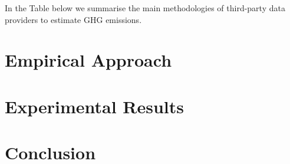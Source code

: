 \documentclass[12pt,twoside]{report}
\begin{document}
In the Table below we summarise the main methodologies of third-party data providers to estimate GHG emissions. 

\chapter{Empirical Approach}\label{sec:EmpiricalApproach}

\chapter{Experimental Results}


\chapter{Conclusion}




\end{document}
